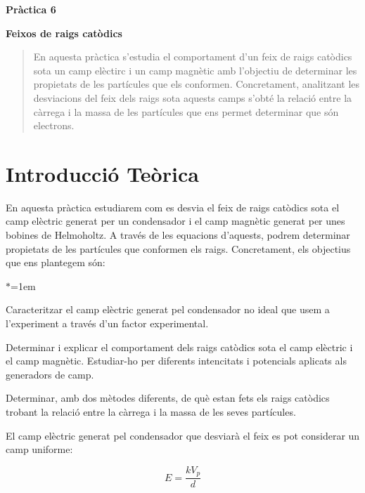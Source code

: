 \documentclass[11pt]{article}
\begin{document}
\tableofcontents
\newpage
\vspace{10em}

{\huge \textbf{Pràctica 6}}  %

\vspace{0.5em}  %

{\Huge \textbf{Feixos de raigs catòdics}}  %

\begin{abstract}
     En aquesta pràctica s'estudia el comportament d'un feix de raigs catòdics sota un camp elèctirc i un camp magnètic amb l'objectiu de determinar les propietats de les partícules que els conformen. Concretament, analitzant les desviacions del feix dels raigs sota aquests camps s'obté la relació entre la càrrega i la massa de les partícules que ens permet determinar que són electrons.
\end{abstract}

\section{Introducció Teòrica}
En aquesta pràctica estudiarem com es desvia el feix de raigs catòdics sota el camp elèctric generat per un condensador i el camp magnètic generat per unes bobines de Helmoholtz. A través de les equacions d'aquests, podrem determinar propietats de les partícules que conformen els raigs. Concretament, els objectius que ens plantegem són:

\begin{list}{$\ast$}{\leftmargin=1em}
    \item Caracteritzar el camp elèctric generat pel condensador no ideal que usem a l'experiment a través d'un factor experimental.
    \item Determinar i explicar el comportament dels raigs catòdics sota el camp elèctric i el camp magnètic. Estudiar-ho per diferents intencitats i potencials aplicats als generadors de camp.
    \item Determinar, amb dos mètodes diferents, de què estan fets els raigs catòdics trobant la relació entre la càrrega i la massa de les seves partícules.
\end{list}

El camp elèctric generat pel condensador que desviarà el feix es pot considerar un camp uniforme:

\begin{equation}
    E = \frac{kV_p}{d}
    \label{eq: Camp E}
\end{equation}
\end{document}
